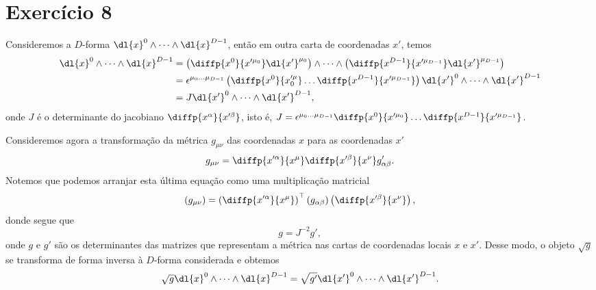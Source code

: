 \section*{Exercício 8}
Consideremos a \(D\)-forma \(\dl{x}^0 \wedge \dots \wedge \dl{x}^{D-1}\), então em outra carta de coordenadas \(x'\), temos
\begin{align*}
    \dl{x}^0 \wedge \dots \wedge \dl{x}^{D-1} &= \left(\diffp{x^0}{x'^{\mu_0}} \dl{x'}^{\mu_0}\right) \wedge \dots \wedge \left(\diffp{x^{D-1}}{x'^{\mu_{D-1}}}\dl{x'}^{\mu_{D-1}}\right)\\
                                              &= \epsilon^{\mu_0\dots\mu_{D-1}} \left(\diffp{x^0}{x'^\mu_0}\dots\diffp{x^{D-1}}{x'^{\mu_{D-1}}}\right) \dl{x'}^0\wedge\dots \wedge\dl{x'}^{D-1}\\
                                              &= J \dl{x'}^0\wedge\dots \wedge\dl{x'}^{D-1},
\end{align*}
onde \(J\) é o determinante do jacobiano \(\diffp{x^\alpha}{x'^\beta}\), isto é, \(J = \epsilon^{\mu_0\dots\mu_{D-1}}\diffp{x^0}{x'^{\mu_0}} \dots \diffp{x^{D-1}}{x'^{\mu_{D-1}}}\).

Consideremos agora a transformação da métrica \(g_{\mu\nu}\) das coordenadas \(x\) para as coordenadas \(x'\)
\begin{equation*}
    g_{\mu\nu} = \diffp{x'^\alpha}{x^\mu}\diffp{x'^\beta}{x^\nu}g'_{\alpha\beta}.
\end{equation*}
Notemos que podemos arranjar esta última equação como uma multiplicação matricial
\begin{equation*}
    (g_{\mu\nu}) = \left(\diffp{x'^\alpha}{x^\mu}\right)^\top(g_{\alpha\beta})\left(\diffp{x'^\beta}{x^\nu}\right),
\end{equation*}
donde segue que
\begin{equation*}
    g = J^{-2} g',
\end{equation*}
onde \(g\) e \(g'\) são os determinantes das matrizes que representam a métrica nas cartas de coordenadas locais \(x\) e \(x'\). Desse modo, o objeto \(\sqrt{g}\) se transforma de forma inversa à \(D\)-forma considerada e obtemos
\begin{equation*}
    \sqrt{g} \dl{x}^0 \wedge \dots \wedge \dl{x}^{D-1} = \sqrt{g'} \dl{x'}^0 \wedge \dots \wedge \dl{x'}^{D-1}.
\end{equation*}
